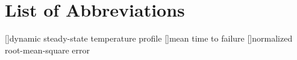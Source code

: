 \chapter*{List of Abbreviations}

\begin{acronym}[DSSTP]
[]{dynamic steady-state temperature profile}
[]{mean time to failure}
[]{normalized root-mean-square error}
\end{acronym}
